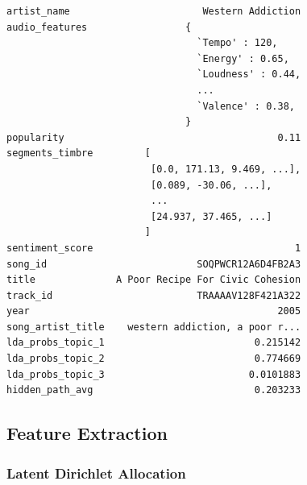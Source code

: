 \documentclass[acmtog]{acmart}
\begin{document}
\begin{verbatim}
artist_name                       Western Addiction
audio_features                 {
                                 `Tempo' : 120,
                                 `Energy' : 0.65,
                                 `Loudness' : 0.44,
                                 ...
                                 `Valence' : 0.38,
                               }
popularity                                     0.11
segments_timbre         [
                         [0.0, 171.13, 9.469, ...],
                         [0.089, -30.06, ...],
                         ...
                         [24.937, 37.465, ...]
                        ]
sentiment_score                                   1
song_id                          SOQPWCR12A6D4FB2A3
title              A Poor Recipe For Civic Cohesion
track_id                         TRAAAAV128F421A322
year                                           2005
song_artist_title    western addiction, a poor r...
lda_probs_topic_1                          0.215142
lda_probs_topic_2                          0.774669
lda_probs_topic_3                         0.0101883
hidden_path_avg                            0.203233
\end{verbatim}

\subsection{Feature Extraction}
\subsubsection{Latent Dirichlet Allocation}
\end{document}
